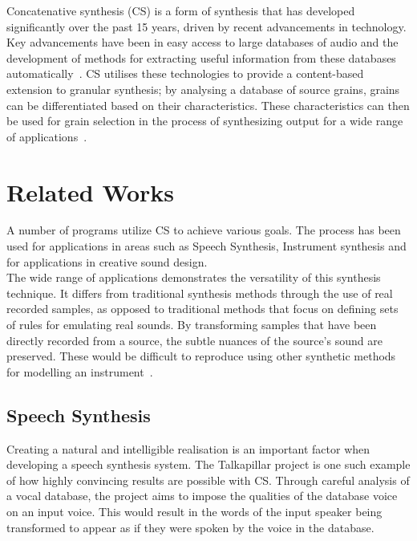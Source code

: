 \documentclass{scrartcl}
\begin{document}
    Concatenative synthesis (CS) is a form of synthesis that has developed
    significantly over the past 15 years, driven by recent advancements in
    technology. Key advancements have been in easy access to large databases of
    audio and the development of methods for extracting useful information from
    these databases automatically~\parencite[p.1]{Schwarz2006a}.  CS utilises
    these technologies to provide a content-based extension to granular
    synthesis; by analysing a database of source grains, grains can be
    differentiated based on their characteristics.  These characteristics can
    then be used for grain selection in the process of synthesizing output for
    a wide range of applications~\parencite[p.102]{Schwarz2007}.

    \section*{Related Works}
    A number of programs utilize CS to achieve various goals. The process has
    been used for applications in areas such as Speech Synthesis, Instrument
    synthesis and for applications in creative sound design.\\
    The wide range of applications demonstrates the versatility of this
    synthesis technique. It differs from traditional synthesis methods through
    the use of real recorded samples, as opposed to traditional methods that
    focus on defining sets of rules for emulating real sounds. By transforming
    samples that have been directly recorded from a source, the subtle nuances
    of the source's sound are preserved. These would be difficult to reproduce
    using other synthetic methods for modelling an
    instrument~\parencite[p.24]{Maestre2009}.

    \subsection*{Speech Synthesis}
    Creating a natural and intelligible realisation is an important factor when
    developing a speech synthesis system. The Talkapillar project is one such
    example of how highly convincing results are possible with CS. Through
    careful analysis of a vocal database, the project aims to impose the
    qualities of the database voice on an input voice. This would result in the
    words of the input speaker being transformed to appear as if they were
    spoken by the voice in the database.~\parencite{Hueber}
    
\end{document}
